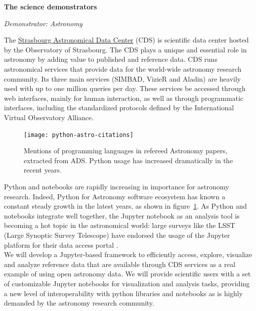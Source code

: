 
\medskip
\textbf{The science demonstrators}


\medskip

\emph{Demonstrator: Astronomy}

  The \href{http://cdsweb.u-strasbg.fr/}{Strasbourg Astronomical Data Center} (CDS) is scientific data
  center hosted by the Observatory of Strasbourg. The CDS plays a unique and
  essential role in astronomy by adding value to published and reference data.
  CDS runs astronomical services that
  provide data for the world-wide astronomy research community. Its three main
  services (SIMBAD, VizieR and Aladin) are heavily used with up to one million
  queries per day.  These services be accessed through web interfaces, mainly
  for human interaction, as well as through programmatic interfaces, including
  the standardized protocols defined by the International Virtual Observatory
  Alliance.

\begin{figure}[ht!]\centering
  \texttt{[image: python-astro-citations]}
  \caption{Mentions of programming languages in refereed Astronomy papers, extracted from ADS. Python usage has increased dramatically in the recent years.}\label{fig:python-astro-citations}
\end{figure}

  Python and notebooks are rapidly increasing in importance for astronomy
  research. Indeed, Python for Astronomy software ecosystem has known a
  constant steady growth in the latest years, as shown in
  figure~\ref{fig:python-astro-citations}. As Python and notebooks integrate
  well together, the Jupyter notebook as an analysis tool is becoming a hot
  topic in the astronomical world: large surveys like the LSST (Large Synoptic
  Survey Telescope) have endorsed the usage of the Jupyter platform for their
    data access portal \cite{lsst2017scienceplatform}.\\


  We will develop a Jupyter-based framework to efficiently access, explore,
  visualize and analyze reference data that are available through CDS services
  as a real example of using open astronomy data.
  We will provide scientific users with a set of customizable Jupyter notebooks
  for visualization and analysis tasks, providing a new level of
  interoperability with python libraries and notebooks as is highly demanded
  by the astronomy research community.

